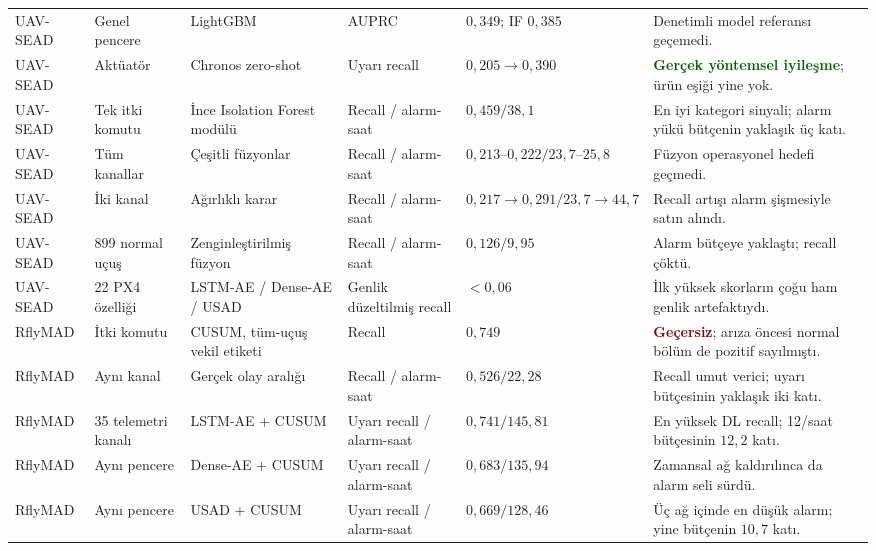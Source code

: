 \documentclass[10pt,a4paper]{article}
\newcommand{\good}[1]{\textcolor{darkgreen}{\textbf{#1}}}
\newcommand{\bad}[1]{\textcolor{darkred}{\textbf{#1}}}
\begin{document}
\begin{landscape}
\begin{longtable}{p{2.2cm}p{3.0cm}p{3.5cm}p{3.0cm}p{3.0cm}p{4.3cm}}
UAV-SEAD & Genel pencere & LightGBM & AUPRC & $0{,}349$; IF $0{,}385$ &
Denetimli model referansı geçemedi. \\

UAV-SEAD & Aktüatör & Chronos zero-shot & Uyarı recall &
$0{,}205 \rightarrow 0{,}390$ & \good{Gerçek yöntemsel iyileşme}; ürün eşiği yine yok. \\

UAV-SEAD & Tek itki komutu & İnce Isolation Forest modülü & Recall / alarm-saat &
$0{,}459 / 38{,}1$ & En iyi kategori sinyali; alarm yükü bütçenin yaklaşık üç katı. \\

UAV-SEAD & Tüm kanallar & Çeşitli füzyonlar & Recall / alarm-saat &
$0{,}213$--$0{,}222 / 23{,}7$--$25{,}8$ & Füzyon operasyonel hedefi geçmedi. \\

UAV-SEAD & İki kanal & Ağırlıklı karar & Recall / alarm-saat &
$0{,}217\rightarrow0{,}291 / 23{,}7\rightarrow44{,}7$ & Recall artışı alarm şişmesiyle satın alındı. \\

UAV-SEAD & 899 normal uçuş & Zenginleştirilmiş füzyon & Recall / alarm-saat &
$0{,}126 / 9{,}95$ & Alarm bütçeye yaklaştı; recall çöktü. \\

UAV-SEAD & 22 PX4 özelliği & LSTM-AE / Dense-AE / USAD & Genlik düzeltilmiş recall &
$<0{,}06$ & İlk yüksek skorların çoğu ham genlik artefaktıydı. \\

RflyMAD & İtki komutu & CUSUM, tüm-uçuş vekil etiketi & Recall & $0{,}749$ &
\bad{Geçersiz}; arıza öncesi normal bölüm de pozitif sayılmıştı. \\

RflyMAD & Aynı kanal & Gerçek olay aralığı & Recall / alarm-saat &
$0{,}526 / 22{,}28$ & Recall umut verici; uyarı bütçesinin yaklaşık iki katı. \\

RflyMAD & 35 telemetri kanalı & LSTM-AE + CUSUM & Uyarı recall / alarm-saat &
$0{,}741 / 145{,}81$ & En yüksek DL recall; 12/saat bütçesinin $12{,}2$ katı. \\

RflyMAD & Aynı pencere & Dense-AE + CUSUM & Uyarı recall / alarm-saat &
$0{,}683 / 135{,}94$ & Zamansal ağ kaldırılınca da alarm seli sürdü. \\

RflyMAD & Aynı pencere & USAD + CUSUM & Uyarı recall / alarm-saat &
$0{,}669 / 128{,}46$ & Üç ağ içinde en düşük alarm; yine bütçenin $10{,}7$ katı. \\


\end{longtable}
\end{landscape}
\end{document}
